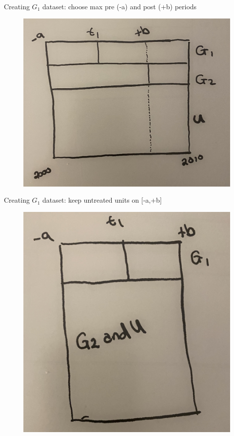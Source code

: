 \documentclass{beamer}
\begin{document}
\begin{frame}{Creating $G_1$ dataset: choose max pre (-a) and post (+b) periods}

	\begin{figure}
	\includegraphics[scale=0.1]{./lecture_includes/stacked2.jpg}
	\end{figure}

\end{frame}

\begin{frame}{Creating $G_1$ dataset: keep untreated units on [-a,+b]}

	\begin{figure}
	\includegraphics[scale=0.085]{./lecture_includes/stacked3.jpg}
	\end{figure}

\end{frame}
\end{document}
